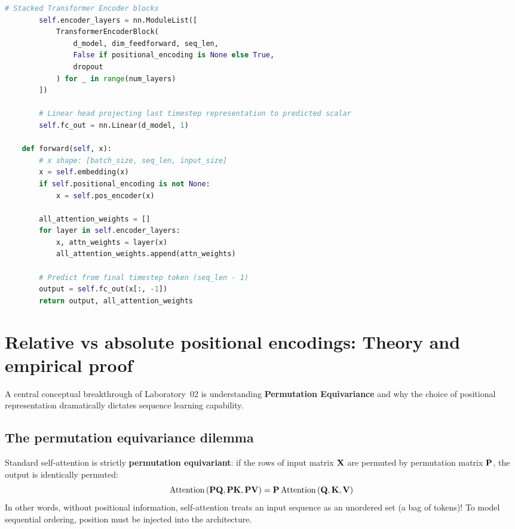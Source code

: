 \documentclass[../labs.tex]{subfiles}
\begin{document}
\begin{lstlisting}[language=Python, caption={Complete \texttt{TransformerEncoderBlock} and \texttt{Transformer} model (Cells 21--24).}, label={lst:lab02_encoder_block}]
        # Stacked Transformer Encoder blocks
        self.encoder_layers = nn.ModuleList([
            TransformerEncoderBlock(
                d_model, dim_feedforward, seq_len, 
                False if positional_encoding is None else True, 
                dropout
            ) for _ in range(num_layers)
        ])
        
        # Linear head projecting last timestep representation to predicted scalar
        self.fc_out = nn.Linear(d_model, 1)

    def forward(self, x):
        # x shape: [batch_size, seq_len, input_size]
        x = self.embedding(x)
        if self.positional_encoding is not None:
            x = self.pos_encoder(x)
        
        all_attention_weights = []
        for layer in self.encoder_layers:
            x, attn_weights = layer(x)
            all_attention_weights.append(attn_weights)

        # Predict from final timestep token (seq_len - 1)
        output = self.fc_out(x[:, -1])
        return output, all_attention_weights
\end{lstlisting}

\section{Relative vs absolute positional encodings: Theory and empirical proof}
\label{sec:lab02_positional_encodings}

A central conceptual breakthrough of Laboratory~02 is understanding \textbf{Permutation Equivariance} and why the choice of positional representation dramatically dictates sequence learning capability.

\subsection{The permutation equivariance dilemma}

Standard self-attention is strictly \textbf{permutation equivariant}: if the rows of input matrix $\mathbf{X}$ are permuted by permutation matrix $\mathbf{P}$, the output is identically permuted:
\begin{equation}
    \operatorname{Attention}\left(\mathbf{P} \mathbf{Q}, \mathbf{P} \mathbf{K}, \mathbf{P} \mathbf{V}\right) = \mathbf{P} \operatorname{Attention}\left(\mathbf{Q}, \mathbf{K}, \mathbf{V}\right)
\end{equation}
In other words, without positional information, self-attention treats an input sequence as an unordered set (a bag of tokens)! To model sequential ordering, position must be injected into the architecture.
\end{document}

